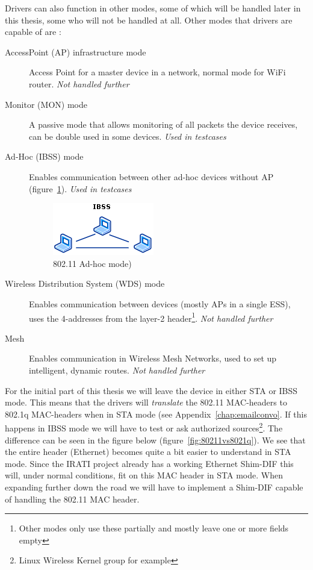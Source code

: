 Drivers can also function in other modes, some of which will be handled later in this thesis, some who will not be handled at all. Other modes that drivers are capable of are \citep{website:80211wirelesskernel}: 
\begin{description}
	\item[AccessPoint (AP) infrastructure mode] Access Point for a master device in a network, normal mode for WiFi router. \emph{Not handled further}
	\item[Monitor (MON) mode] A passive mode that allows monitoring of all packets the device receives, can be double used in some devices. \emph{Used in testcases}
	\item[Ad-Hoc (IBSS) mode] Enables communication between other ad-hoc devices without AP (figure~\ref{fig:80211adhoc}). \emph{Used in testcases}

\begin{figure}[H]
    \centering
    \includegraphics{figures/80211adhoc}
    \caption{802.11 Ad-hoc mode) \citep{website:80211microsoft}} 
    \label{fig:80211adhoc}
\end{figure}

	\item[Wireless Distribution System (WDS) mode] Enables communication between devices (mostly APs in a single ESS), uses the 4-addresses from the layer-2 header\footnote{Other modes only use these partially and mostly leave one or more fields empty}. \emph{Not handled further}
	\item[Mesh] Enables communication in Wireless Mesh Networks, used to set up intelligent, dynamic routes. \emph{Not handled further}
 \end{description}


\npar

For the initial part of this thesis we will leave the device in either STA or IBSS mode. This means that the drivers will \emph{translate} the 802.11 MAC-headers to 802.1q MAC-headers when in STA mode (see Appendix~\ref{chap:emailconvo}. If this happens in IBSS mode we will have to test or ask authorized sources\footnote{Linux Wireless Kernel group for example}. The difference can be seen in the figure below (figure~\ref{fig:80211vs8021q}). We see that the entire header (Ethernet) becomes quite a bit easier to understand in STA mode. Since the IRATI project already has a working Ethernet Shim-DIF this will, under normal conditions, fit on this MAC header in STA mode. When expanding further down the road we will have to implement a Shim-DIF capable of handling the 802.11 MAC header. 


